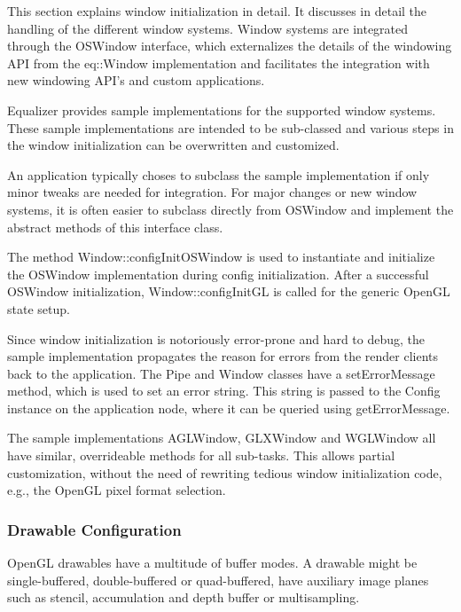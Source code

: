 \documentclass[10pt,a4]{scrartcl}
\begin{document}
This section explains window initialization in detail. It discusses in
detail the handling of the different window systems. Window systems are
integrated through the \textsf{OSWindow} interface, which externalizes
the details of the windowing API from the \textsf{eq::Window}
implementation and facilitates the integration with new windowing API's
and custom applications.

Equalizer provides sample implementations for the supported window
systems. These sample implementations are intended to be sub-classed and
various steps in the window initialization can be overwritten and
customized.

An application typically choses to subclass the sample implementation if
only minor tweaks are needed for integration. For major changes or new
window systems, it is often easier to subclass directly from
\textsf{OSWindow} and implement the abstract methods of this interface
class.

The method \textsf{Window::configInitOSWindow} is used to instantiate
and initialize the \textsf{OSWindow} implementation during config
initialization. After a successful \textsf{OSWindow} initialization,
\textsf{Window::configInitGL} is called for the generic OpenGL state
setup.

Since window initialization is notoriously error-prone and hard to
debug, the sample implementation propagates the reason for errors
from the render clients back to the application. The \textsf{Pipe} and
\textsf{Window} classes have a \textsf{setErrorMessage} method, which is
used to set an error string. This string is passed to the
\textsf{Config} instance on the application node, where it can be
queried using \textsf{getErrorMessage}.

The sample implementations \textsf{AGLWindow}, \textsf{GLXWindow} and
\textsf{WGLWindow} all have similar, overrideable methods for all
sub-tasks. This allows partial customization, without the need of
rewriting tedious window initialization code, e.g., the OpenGL pixel
format selection.

\subsubsection{\label{sDrawableConfig}Drawable Configuration}

OpenGL drawables have a multitude of buffer modes. A drawable might be
single-buffered, double-buffered or quad-buffered, have auxiliary image
planes such as stencil, accumulation and depth buffer or multisampling.
\end{document}
